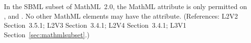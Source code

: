 In the SBML subset of MathML~2.0, the MathML attribute
 is only permitted on ,
 and .  No other
MathML elements may have the  attribute.
(References: L2V2 Section~3.5.1; L2V3 Section~3.4.1; 
L2V4 Section~3.4.1; L3V1 Section~\ref{sec:mathmlsubset}.)
